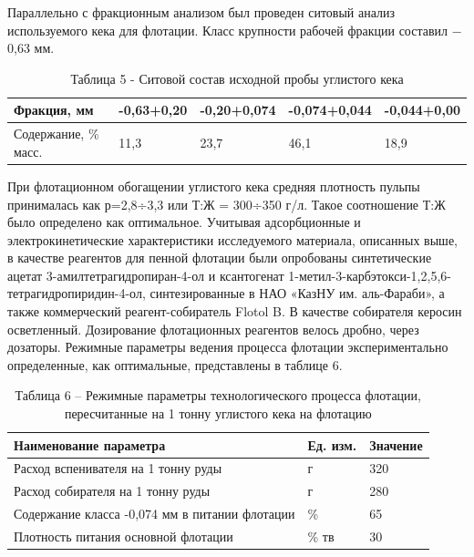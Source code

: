 Параллельно с фракционным анализом был проведен ситовый анализ
используемого кека для флотации. Класс крупности рабочей фракции
составил − 0,63 мм.

\begin{table}[H]
\caption*{Таблица 5 - Ситовой состав исходной пробы углистого кека}
\centering
\begin{tabular}{|l|l|l|l|l|}
\hline
Фракция, мм & -0,63+0,20 & -0,20+0,074 & -0,074+0,044 & -0,044+0,00 \\ \hline
Содержание, \% масс. & 11,3 & 23,7 & 46,1 & 18,9 \\ \hline
\end{tabular}
\end{table}

\begin{multicols}{2}
При флотационном обогащении углистого кека средняя плотность пульпы
принималась как р=2,8÷3,3 или Т:Ж = 300÷350 г/л. Такое соотношение Т:Ж
было определено как оптимальное. Учитывая адсорбционные и
электрокинетические характеристики исследуемого материала, описанных
выше, в качестве реагентов для пенной флотации были опробованы
синтетические ацетат 3-амилтетрагидропиран-4-ол и ксантогенат
1-метил-3-карбэтокси-1,2,5,6-тетрагидропиридин-4-ол, синтезированные в
НАО «КазНУ им. аль-Фараби», а также коммерческий реагент-собиратель
Flotol B. В качестве собирателя керосин осветленный. Дозирование
флотационных реагентов велось дробно, через дозаторы. Режимные параметры
ведения процесса флотации экспериментально определенные, как
оптимальные, представлены в таблице 6.
\end{multicols}

\begin{table}[H]
\caption*{Таблица 6 -- Режимные параметры технологического процесса флотации, пересчитанные на 1 тонну углистого кека на флотацию}
\centering
\begin{tabular}{|l|l|l|}
\hline
Наименование параметра & Ед. изм. & Значение \\ \hline
Расход вспенивателя на 1 тонну руды & г & 320 \\ \hline
Расход собирателя на 1 тонну руды & г & 280 \\ \hline
Содержание класса -0,074 мм в питании флотации & \% & 65 \\ \hline
Плотность питания основной флотации & \% тв & 30 \\ \hline
\end{tabular}
\end{table}

